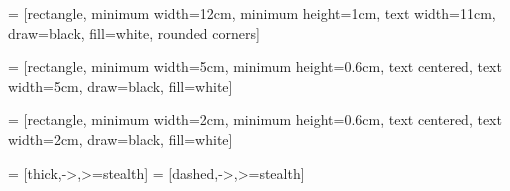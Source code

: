 \usepackage{tikz}
\usetikzlibrary{calc}
\usetikzlibrary{shapes.geometric, arrows, fit}

 = [rectangle, 
minimum width=12cm, 
minimum height=1cm, 
text width=11cm, 
draw=black, 
fill=white,
rounded corners]

 = [rectangle, 
minimum width=5cm, 
minimum height=0.6cm, 
text centered, 
text width=5cm, 
draw=black, 
fill=white]

 = [rectangle, 
minimum width=2cm, 
minimum height=0.6cm, 
text centered, 
text width=2cm, 
draw=black, 
fill=white]

 = [thick,->,>=stealth]
 = [dashed,->,>=stealth]